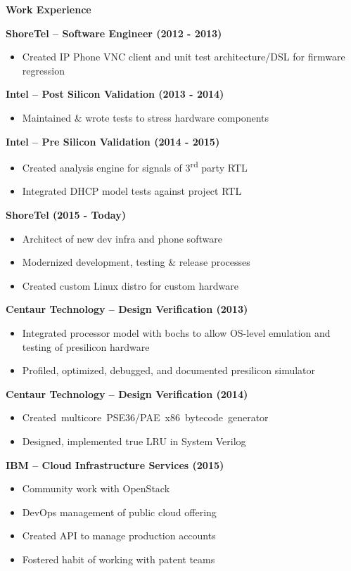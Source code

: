 \documentclass{report}
\begin{document}
\textbf{Work Experience} \\
\begin{paracol}{2}
  \textbf{ShoreTel -- Software Engineer (2012 - 2013)}
  \begin{itemize}[label=$\circ$]
  \item Created IP Phone VNC client and unit test architecture/DSL for firmware
    regression
  \end{itemize}

  \textbf{Intel -- Post Silicon Validation (2013 - 2014)}
  \begin{itemize}[label=$\circ$]
  \item Maintained \& wrote tests to stress hardware components
  \end{itemize}

  \textbf{Intel -- Pre Silicon Validation (2014 - 2015)}
  \begin{itemize}[label=$\circ$]
  \item Created analysis engine for signals of 3\textsuperscript{rd} party RTL
  \item Integrated DHCP model tests against project RTL
  \end{itemize}

  \textbf{ShoreTel (2015 - Today)}
  \begin{itemize}[label=$\circ$]
  \item Architect of new dev infra and phone software
  \item Modernized development, testing \& release processes
  \item Created custom Linux distro for custom hardware
  \end{itemize}

  \switchcolumn{}
  \textbf{Centaur Technology -- Design Verification (2013)}
  \begin{itemize}[label=$\circ$]
  \item Integrated processor model with bochs to allow OS-level
    emulation and testing of presilicon hardware
  \item Profiled, optimized, debugged, and documented presilicon simulator
  \end{itemize}

  \textbf{Centaur Technology -- Design Verification (2014)}
  \begin{itemize}[label=$\circ$]
  \item \mbox{Created multicore PSE36/PAE x86 bytecode generator}
  \item Designed, implemented true LRU in System Verilog
  \end{itemize}

  \textbf{IBM -- Cloud Infrastructure Services (2015)}
  \begin{itemize}[label=$\circ$]
  \item Community work with OpenStack
  \item DevOps management of public cloud offering
  \item Created API to manage production accounts
  \item Fostered habit of working with patent teams
  \end{itemize}
\end{paracol}
\end{document}
